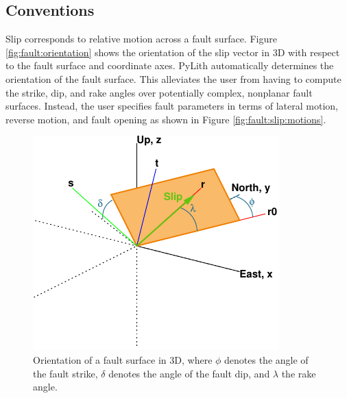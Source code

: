 \subsection{Conventions}

Slip corresponds to relative motion across a fault surface. Figure
\vref{fig:fault:orientation} shows the orientation of the slip vector
in 3D with respect to the fault surface and coordinate axes. PyLith
automatically determines the orientation of the fault surface. This
alleviates the user from having to compute the strike, dip, and rake
angles over potentially complex, nonplanar fault surfaces. Instead,
the user specifies fault parameters in terms of lateral motion, reverse
motion, and fault opening as shown in Figure \vref{fig:fault:slip:motions}.

\noindent \begin{center}
\begin{figure}[H]
\begin{centering}
\includegraphics{boundaryconditions/figs/faultOrientation}
\par\end{centering}

\caption{Orientation of a fault surface in 3D, where $\phi$ denotes the angle
of the fault strike, $\delta$ denotes the angle of the fault dip,
and $\lambda$ the rake angle. \label{fig:fault:orientation} }
\end{figure}

\par\end{center}

